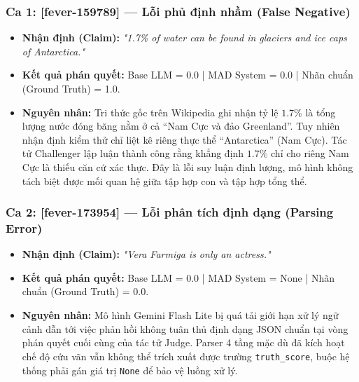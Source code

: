 \documentclass[12pt,a4paper]{report}
\begin{document}
\subsubsection{Ca 1: [fever-159789] — Lỗi phủ định nhầm (False Negative)}
\begin{itemize}
    \item \textbf{Nhận định (Claim):} \textit{"1.7\% of water can be found in glaciers and ice caps of Antarctica."}
    \item \textbf{Kết quả phán quyết:} Base LLM = 0.0 | MAD System = 0.0 | Nhãn chuẩn (Ground Truth) = 1.0.
    \item \textbf{Nguyên nhân:} Tri thức gốc trên Wikipedia ghi nhận tỷ lệ $1.7\%$ là tổng lượng nước đóng băng nằm ở cả ``Nam Cực và đảo Greenland''. Tuy nhiên nhận định kiểm thử chỉ liệt kê riêng thực thể ``Antarctica'' (Nam Cực). Tác tử Challenger lập luận thành công rằng khẳng định $1.7\%$ chỉ cho riêng Nam Cực là thiếu căn cứ xác thực. Đây là lỗi suy luận định lượng, mô hình không tách biệt được mối quan hệ giữa tập hợp con và tập hợp tổng thể.
\end{itemize}

\subsubsection{Ca 2: [fever-173954] — Lỗi phân tích định dạng (Parsing Error)}
\begin{itemize}
    \item \textbf{Nhận định (Claim):} \textit{"Vera Farmiga is only an actress."}
    \item \textbf{Kết quả phán quyết:} Base LLM = 0.0 | MAD System = None | Nhãn chuẩn (Ground Truth) = 0.0.
    \item \textbf{Nguyên nhân:} Mô hình Gemini Flash Lite bị quá tải giới hạn xử lý ngữ cảnh dẫn tới việc phản hồi không tuân thủ định dạng JSON chuẩn tại vòng phán quyết cuối cùng của tác tử Judge. Parser 4 tầng mặc dù đã kích hoạt chế độ cứu vãn vẫn không thể trích xuất được trường \texttt{truth_score}, buộc hệ thống phải gán giá trị \texttt{None} để bảo vệ luồng xử lý.
\end{itemize}
\end{document}
